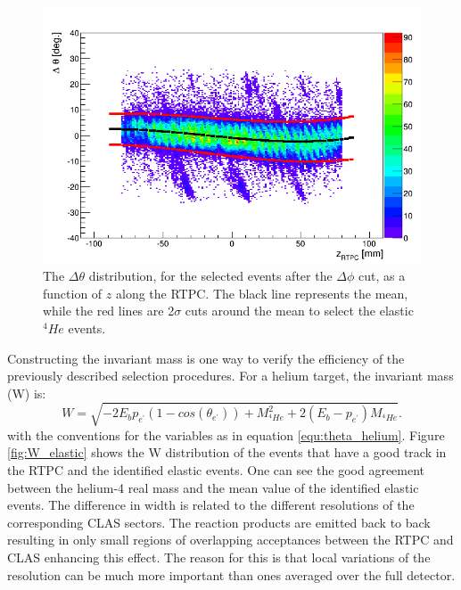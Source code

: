 \begin{figure}[tbp]
\centering
\includegraphics[scale=0.370]{fig_rtpc/delta_theta_z.png}
\caption[]{The $\Delta \theta$ distribution, for the selected events after the $\Delta \phi$ cut, as a function of $z$ along the RTPC. The black line represents the mean, while the red lines are 2$\sigma$ cuts around the mean to select the elastic $^4He$ events. } 
\label{fig:delta_theta_elastic}
\end{figure} 


Constructing the invariant mass is one way to verify the efficiency of the previously described selection procedures. For a helium target, the invariant mass (W) is:\\
\begin{equation}
 W = \sqrt{-2E_{b}p_{e^{'}}(1-cos(\theta_{e^{'}})) + M_{^{4}He}^2 + 2(E_{b}-p_{e^{'}}) M_{^{4}He}}.
\end{equation}
with the conventions for the variables as in equation \ref{equ:theta_helium}. Figure \ref{fig:W_elastic} shows the W distribution of the events that have a good track in the RTPC and the identified elastic events. One can see the good agreement between the helium-4 real mass and the mean value of the identified elastic events. The difference in width is related to the different resolutions of the corresponding CLAS sectors. The reaction products are emitted back to back resulting in only small regions of overlapping acceptances between the RTPC and CLAS enhancing this effect. The reason for this is that local variations of the resolution can be much more important than ones averaged over the full detector.
\\

